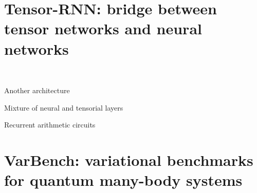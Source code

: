 \chapter{Tensor-RNN: bridge between tensor networks and neural networks}
\label{ch:tensor-rnn}

~\cite{gao2017efficient}

Another architecture~\cite{hibat2021variational, hibat2022supplementing}

Mixture of neural and tensorial layers~\cite{chen2023antn}

Recurrent arithmetic circuits~\cite{levine2017long, levine2019quantum}

\chapter{VarBench: variational benchmarks for quantum many-body systems}
\label{ch:varbench}
